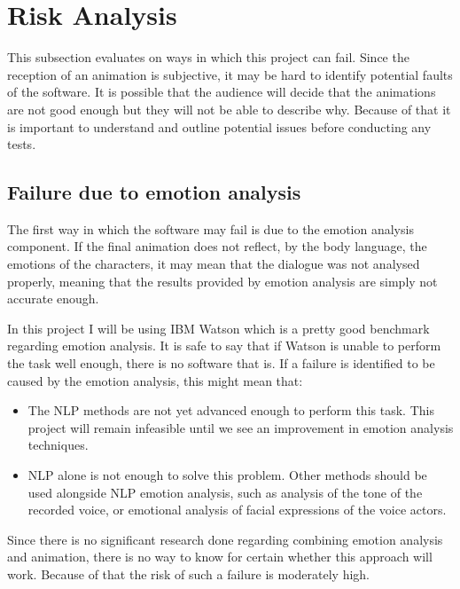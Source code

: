 \section{Risk Analysis}
\label{sec:riskanal}

This subsection evaluates on ways in which this project can fail. Since the reception of an animation is subjective, it may be hard to identify potential faults of the software. It is possible that the audience will decide that the animations are not good enough but they will not be able to describe why. Because of that it is important to understand and outline potential issues before conducting any tests.

\bigskip
\subsection{Failure due to emotion analysis}
The first way in which the software may fail is due to the emotion analysis component. If the final animation does not reflect, by the body language, the emotions of the characters, it may mean that the dialogue was not analysed properly, meaning that the results provided by emotion analysis are simply not accurate enough.

In this project I will be using IBM Watson which is a pretty good benchmark regarding emotion analysis. It is safe to say that if Watson is unable to perform the task well enough, there is no software that is. If a failure is identified to be caused by the emotion analysis, this might mean that:
\begin{itemize}
\item The NLP methods are not yet advanced enough to perform this task. This project will remain infeasible until we see an improvement in emotion analysis techniques.
\item NLP alone is not enough to solve this problem. Other methods should be used alongside NLP emotion analysis, such as analysis of the tone of the recorded voice, or emotional analysis of facial expressions of the voice actors.
\end{itemize}

Since there is no significant research done regarding combining emotion analysis and animation, there is no way to know for certain whether this approach will work. Because of that the risk of such a failure is moderately high.


\bigskip
